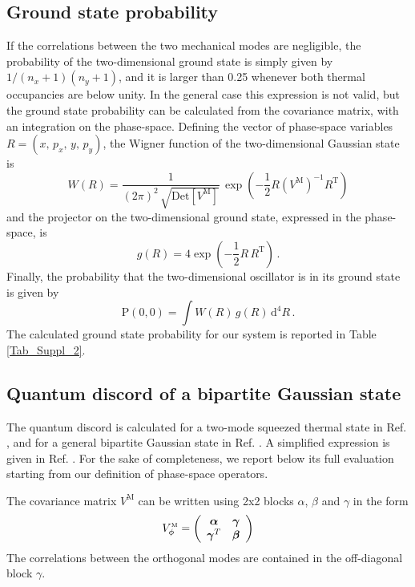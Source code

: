 \documentclass[11pt,floatfix,amssymb,prx,aps,longbibliography,superscriptaddress,nopacs]{revtex4-2}
\newcommand{\Vm}{V^{\scriptscriptstyle{\mathrm{M}}}}
\newcommand{\nX}{n_{\scriptstyle{x}}}
\newcommand{\nY}{n_{\scriptstyle{y}}}
\begin{document}
\subsection*{Ground state probability}

If the correlations between the two mechanical modes are negligible, the probability of the two-dimensional ground state is simply given by $1/(\nX+1)(\nY+1)$, and it is larger than 0.25 whenever both thermal occupancies are below unity. In the general case this expression is not valid, but the ground state probability can be calculated from the covariance matrix, with an integration on the phase-space. Defining the vector of phase-space variables $R=(x,\, p_x,\, y,\, p_y)$, the Wigner function of the two-dimensional Gaussian state is \cite{Paris2003}
\begin{equation}
    W(R) = \frac{1}{(2\pi)^2\,\sqrt{\mathrm{Det}[\Vm]}}\,\exp\left(-\frac{1}{2} R (\Vm)^{-1} R^{\mathrm{T}}\right)
\end{equation}
and the projector on the two-dimensional ground state, expressed in the phase-space, is 
\begin{equation}
g(R) = 4 \exp \left(-\frac{1}{2} R\,R^{\mathrm{T}}\right)  \, .
\end{equation}
Finally, the probability that the two-dimensional oscillator is in its ground state is given by
\begin{equation}
    \mathrm{P}(0,0) = \int W(R)\,g(R)\, \mathrm{d}^4R  \,.
\end{equation}
The calculated ground state probability for our system is reported in Table \ref{Tab_Suppl_2}.

\subsection*{Quantum discord of a bipartite Gaussian state}

The quantum discord is calculated for a two-mode squeezed thermal state in Ref.
 \cite{Giorda2010}, 
and for a general bipartite Gaussian state in Ref.
\cite{Adesso2010}. 
A simplified expression is given in Ref. 
\cite{Olivares2012}. 
For the sake of completeness, we report below its full evaluation starting from our definition of phase-space operators.

The covariance matrix $\Vm$ can be written using 2x2 blocks {\boldmath $\alpha$}, {\boldmath $\beta$} and {\boldmath $\gamma$} in the form
\begin{displaymath}
    \Vm_{\scriptstyle{\phi}} = 
    \left( \begin{array}{cc}
    \mbox{\boldmath $\alpha$} & \mbox{\boldmath $\gamma$} \\
    \mbox{\boldmath $\gamma$}^{\scriptstyle{T}}  &  \mbox{\boldmath $\beta$}
    \end{array}  \right)
\end{displaymath}
The correlations between the orthogonal modes are contained in the off-diagonal  block {\boldmath $\gamma$}.
\end{document}
